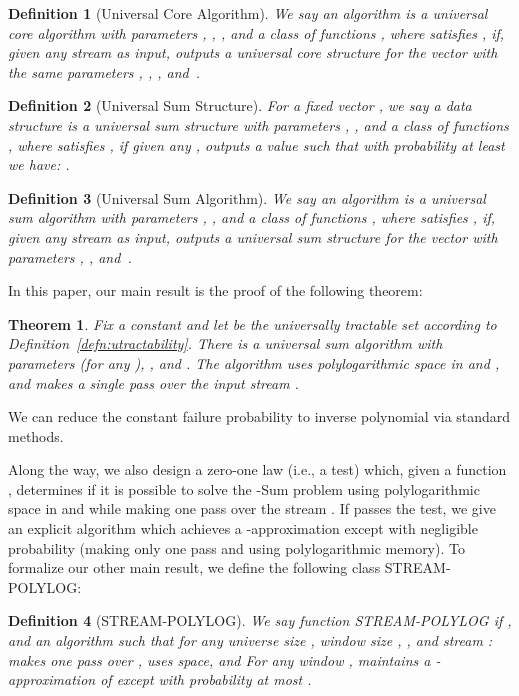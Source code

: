 \documentclass[11pt]{article}
\newtheorem{thm}{Theorem}
\newtheorem{defn}{Definition}
\begin{document}
\begin{defn}[Universal Core Algorithm]\label{defn:uca}
We say an algorithm  is a universal core algorithm with parameters , ,
,
and a class of functions , where 
satisfies , if, given any stream  as input,
 outputs a universal core structure for the vector  with the same parameters
, , , and~.
\end{defn}

\begin{defn}[Universal Sum Structure]\label{defn:uss}
For a fixed vector , we say a data structure  is a universal sum structure with
parameters , , and a class of functions , where 
satisfies , if given any ,  outputs a value 
such that with probability at least  we have:
.
\end{defn}

\begin{defn}[Universal Sum Algorithm]\label{defn:usa}
We say an algorithm  is a universal sum algorithm with parameters , ,
and a class of functions , where 
satisfies , if, given any stream  as input,
 outputs a universal sum structure for the vector  with parameters , ,
and~.
\end{defn}

In this paper, our main result is the proof of the following theorem:
\begin{thm}\label{thm:mainusum}
Fix a constant  and let  be the universally tractable set according to Definition~\ref{defn:utractability}.
There is a universal sum algorithm with parameters
 (for any ), ,
and .  The algorithm uses polylogarithmic space in  and , and
makes a single pass over the input stream .
\end{thm}

\noindent We can reduce the constant failure probability to inverse polynomial via standard methods.

Along the way, we also design a zero-one law (i.e., a test) which, given a function ,
determines if it is possible to solve the -Sum problem
using polylogarithmic space in  and  while making one pass over the stream .  If
 passes the test, we give an explicit algorithm which achieves a -approximation
except with negligible probability (making only one pass and using polylogarithmic memory).
To formalize our other main result, we define the following class {\sf STREAM-POLYLOG}:
\begin{defn}[{\sf STREAM-POLYLOG}]\label{def: strplg}
We say function  {\sf STREAM-POLYLOG} if ,  and
an algorithm  such that for any universe size , window size , ,
and stream :
  makes one pass over ,   uses  space, and 
For any window ,  maintains a -approximation of 
except with probability at most .
\end{defn}
\end{document}
